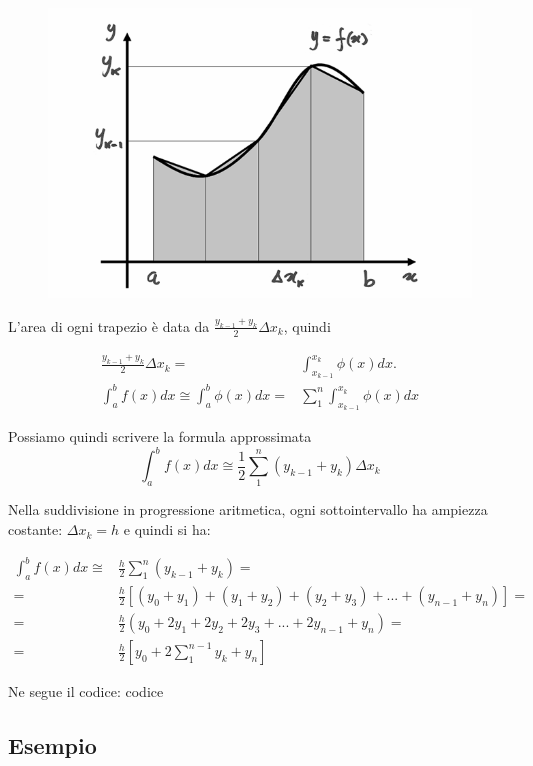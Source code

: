 \documentclass{article}
\begin{document}
\begin{figure}[ht]
\centering
\includegraphics[scale=0.25]{img/09_02_int_trapezi.png} 
\label{fig:trap}
\end{figure}

L’area di ogni trapezio è data da $\frac{y_{k-1}+y_k}{2}\Delta x_k$, quindi

\begin{align*}
\frac{y_{k-1}+y_k}{2}\Delta x_k=&\int_{x_{k-1}}^{x_k}\phi(x)dx.\\
\int_a^bf(x)dx \cong \int_a^b\phi(x)dx=&\sum_1^n\int_{x_{k-1}}^{x_k}\phi(x)dx
\end{align*}

Possiamo quindi scrivere la formula approssimata
\[
\int_a^bf(x)dx\cong \frac{1}{2}\sum_1^n (y_{k-1}+y_k)\Delta x_k\]

Nella suddivisione in progressione aritmetica, ogni sottointervallo ha ampiezza costante: $\Delta x_k=h$ e quindi si ha:

\begin{align*}
\int_a^bf(x)dx\cong &\frac{h}{2}\sum_1^n (y_{k-1}+y_k)=\\
=&\frac{h}{2}[(y_0+y_1)+(y_1+y_2)+(y_2+y_3)+ ... +(y_{n-1}+y_n)]=\\
=&\frac{h}{2}(y_0+2y_1+2y_2+2y_3+ ... +2y_{n-1}+y_n)=\\
=&\frac{h}{2}\left[y_0+2\sum_1^{n-1}y_k+y_n \right]
\end{align*}

Ne segue il codice: 
codice

\subsection{Esempio}
\end{document}

